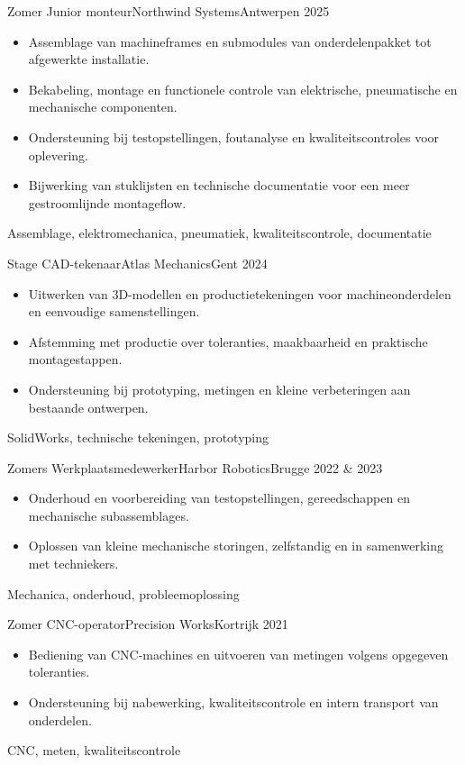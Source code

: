 \begin{ervaringen}

    \ervaring
    {Zomer}
    {Junior monteur}{Northwind Systems}{Antwerpen}
    {2025}
    {
        \begin{itemize}
            \item Assemblage van machineframes en submodules van onderdelenpakket tot afgewerkte installatie.
            \item Bekabeling, montage en functionele controle van elektrische, pneumatische en mechanische componenten.
            \item Ondersteuning bij testopstellingen, foutanalyse en kwaliteitscontroles voor oplevering.
            \item Bijwerking van stuklijsten en technische documentatie voor een meer gestroomlijnde montageflow.
        \end{itemize}
    }
    {Assemblage, elektromechanica, pneumatiek, kwaliteitscontrole, documentatie}
    \leegescheider

    \ervaring
    {Stage}
    {CAD-tekenaar}{Atlas Mechanics}{Gent}
    {2024}
    {
        \begin{itemize}
            \item Uitwerken van 3D-modellen en productietekeningen voor machineonderdelen en eenvoudige samenstellingen.
            \item Afstemming met productie over toleranties, maakbaarheid en praktische montagestappen.
            \item Ondersteuning bij prototyping, metingen en kleine verbeteringen aan bestaande ontwerpen.
        \end{itemize}
    }
    {SolidWorks, technische tekeningen, prototyping}
    \leegescheider

    \ervaring
    {Zomers}
    {Werkplaatsmedewerker}{Harbor Robotics}{Brugge}
    {2022 \& 2023}
    {
        \begin{itemize}
            \item Onderhoud en voorbereiding van testopstellingen, gereedschappen en mechanische subassemblages.
            \item Oplossen van kleine mechanische storingen, zelfstandig en in samenwerking met techniekers.
        \end{itemize}
    }
    {Mechanica, onderhoud, probleemoplossing}
    \leegescheider

    \ervaring
    {Zomer}
    {CNC-operator}{Precision Works}{Kortrijk}
    {2021}
    {
        \begin{itemize}
            \item Bediening van CNC-machines en uitvoeren van metingen volgens opgegeven toleranties.
            \item Ondersteuning bij nabewerking, kwaliteitscontrole en intern transport van onderdelen.
        \end{itemize}
    }
    {CNC, meten, kwaliteitscontrole}
    \leegescheider


\end{ervaringen}
